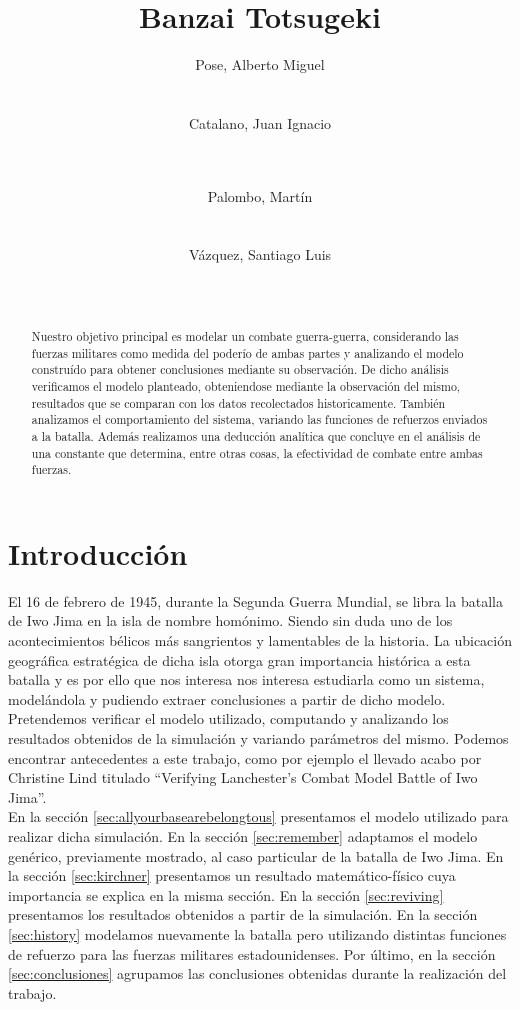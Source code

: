 \documentclass{sig-alternate}
\title{Banzai Totsugeki}
\author{
\alignauthor
Pose, Alberto Miguel\\
       \affaddr{Instituto Tecnológico de Buenos Aires}\\
       \affaddr{Buenos Aires, Argentina}\\
       \email{apose@alu.itba.edu.ar}
\alignauthor
Catalano, Juan Ignacio\\
       \affaddr{Instituto Tecnológico de Buenos Aires}\\
       \affaddr{Buenos Aires, Argentina}\\
       \email{jcatalan@alu.itba.edu.ar}
\and
\alignauthor 
Palombo, Martín\\
       \affaddr{Instituto Tecnológico de Buenos Aires}\\
       \affaddr{Buenos Aires, Argentina}\\
       \email{mpalombo@alu.itba.edu.ar}
\alignauthor 
Vázquez, Santiago Luis\\
       \affaddr{Instituto Tecnológico de Buenos Aires}\\
       \affaddr{Buenos Aires, Argentina}\\
       \email{savazque@alu.itba.edu.ar}
}
\date{}
\begin{document}
\maketitle

\begin{abstract}
Nuestro objetivo principal es modelar un combate guerra-guerra, considerando las fuerzas militares como medida del poder\'io de ambas partes y 
analizando el modelo constru\'ido para obtener conclusiones mediante su observaci\'on. De dicho an\'alisis verificamos el modelo planteado, obteniendose
mediante la observaci\'on del mismo, resultados que se comparan con los datos recolectados historicamente. Tambi\'en analizamos el comportamiento del sistema, 
variando las funciones de refuerzos enviados a la batalla. Adem\'as realizamos una deducci\'on anal\'itica que concluye en el análisis de una
constante que determina, entre otras cosas, la efectividad de combate entre ambas fuerzas.
\end{abstract} 

\newpage

\section{Introducci\'on}

El 16 de febrero de 1945, durante la Segunda Guerra Mundial, se libra la batalla de Iwo Jima en la isla de nombre homónimo. 
Siendo sin duda uno de los acontecimientos bélicos más sangrientos y lamentables de la historia. La ubicación geográfica estratégica de dicha
isla otorga gran importancia histórica a esta batalla y es por ello que nos interesa nos interesa estudiarla como un sistema, modelándola y 
pudiendo extraer conclusiones a partir de dicho modelo. Pretendemos verificar el modelo utilizado,
computando y analizando los resultados obtenidos de la simulación y variando parámetros del mismo. Podemos encontrar antecedentes a este 
trabajo, como por ejemplo el llevado acabo por Christine Lind titulado ``Verifying Lanchester’s Combat Model Battle of Iwo Jima''. \\ 
En la secci\'on \ref{sec:allyourbasearebelongtous} presentamos el modelo utilizado para realizar dicha simulaci\'on. En la secci\'on \ref{sec:remember} 
adaptamos el modelo genérico, previamente mostrado, al caso particular de la batalla de Iwo Jima. En la sección \ref{sec:kirchner} presentamos un resultado 
matem\'atico-f\'isico cuya importancia se explica en la misma secci\'on. En la secci\'on \ref{sec:reviving} presentamos los resultados obtenidos a partir de la simulaci\'on. 
En la sección \ref{sec:history} modelamos nuevamente la batalla pero utilizando distintas funciones de refuerzo para las fuerzas militares estadounidenses.
Por \'ultimo, en la secci\'on \ref{sec:conclusiones} agrupamos las conclusiones obtenidas durante la realizaci\'on del trabajo.
\end{document}
